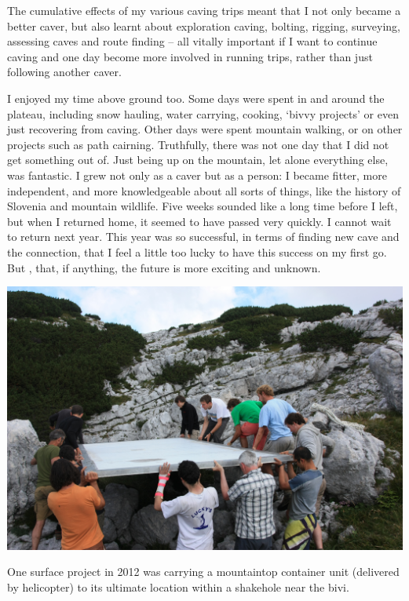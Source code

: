 The cumulative effects of my various caving trips meant that I not only became a better caver, but also learnt about exploration caving, bolting, rigging, surveying, assessing caves and route finding – all vitally important if I want to continue caving and one day become more involved in running trips, rather than just following another caver.






I enjoyed my time above ground too. Some days were spent in and around the plateau, including snow hauling, water carrying, cooking, ‘bivvy projects’ or even just recovering from caving. Other days were spent mountain walking, or on other projects such as path cairning. Truthfully, there was not one day that I did not get something out of. Just being up on the mountain, let alone everything else, was fantastic. I grew not only as a caver but as a person: I became fitter, more independent, and more knowledgeable about all sorts of things, like the history of Slovenia and mountain wildlife. Five weeks sounded like a long time before I left, but when I returned home, it seemed to have passed very quickly. I cannot wait to return next year. This year was so successful, in terms of finding new cave and the connection, that I feel a little too lucky to have this success on my first go. But , that, if anything, the future is more exciting and unknown.


\begin{pagefigure}
\checkoddpage \ifoddpage \forcerectofloat \else \forceversofloat \fi
   \centering
\includegraphics[width = \textwidth]{2012/alex_pitcher/2012-08-11-0157-GergelyAmbrus-IMG_2373--orig.jpg}
\caption{One surface project in 2012 was carrying a mountaintop container unit (delivered by helicopter) to its ultimate location within a shakehole near the bivi. } \label{container}
\end{pagefigure}

